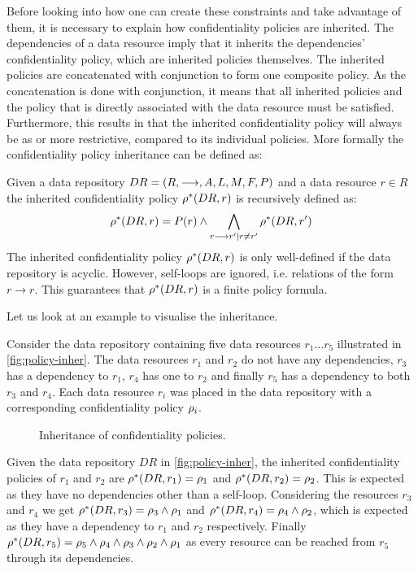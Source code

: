 Before looking into how one can create these constraints and take advantage of them, it is necessary to explain how confidentiality policies are inherited. The dependencies of a data resource imply that it inherits the dependencies' confidentiality policy, which are inherited policies themselves. The inherited policies are concatenated with conjunction to form one composite policy. As the concatenation is done with conjunction, it means that all inherited policies and the policy that is directly associated with the data resource must be satisfied. Furthermore, this results in that the inherited confidentiality policy will always be as or more restrictive, compared to its individual policies. More formally the confidentiality policy inheritance can be defined as:
\begin{definition}\label{def:cpi}
Given a data repository $DR= \left( R, \longrightarrow, A, L, M, F, P \right)$ and a data resource $r \in R$ the inherited confidentiality policy $\rho^{\ast}(DR, r)$ is recursively defined as:
\begin{equation*}
    \rho^{\ast}(DR, r) = P(r) \land \bigwedge\limits_{r \longrightarrow r' \mid r \neq r'} \rho^{\ast}(DR, r')
\end{equation*}
The inherited confidentiality policy $\rho^{\ast}(DR, r)$ is only well-defined if the data repository is acyclic. However, self-loops are ignored, i.e. relations of the form $r \longrightarrow r$. This guarantees that $\rho^{\ast}(DR, r)$ is a finite policy formula.
\end{definition}

Let us look at an example to visualise the inheritance.
\begin{example}
Consider the data repository containing five data resources $r_1\ldots r_5$ illustrated in \autoref{fig:policy-inher}. The data resources $r_1$ and $r_2$ do not have any dependencies, $r_3$ has a dependency to $r_1$, $r_4$ has one to $r_2$ and finally $r_5$ has a dependency to both $r_3$ and $r_4$. Each data resource $r_i$ was placed in the data repository with a corresponding confidentiality policy $\rho_i$.
\begin{figure}[!ht]
    \begin{center}
        
        \caption{Inheritance of confidentiality policies.}
        \label{fig:policy-inher}
    \end{center}
\end{figure}
Given the data repository $DR$ in \autoref{fig:policy-inher}, the inherited confidentiality policies of $r_1$ and $r_2$ are $\rho^{\ast}(DR, r_1) = \rho_1$ and $\rho^{\ast}(DR, r_2) = \rho_2$. This is expected as they have no dependencies other than a self-loop. Considering the resources $r_3$ and $r_4$ we get $\rho^{\ast}(DR, r_3) = \rho_3 \land \rho_1$ and $\rho^{\ast}(DR, r_4) = \rho_4 \land \rho_2$, which is expected as they have a dependency to $r_1$ and $r_2$ respectively. Finally $\rho^{\ast}(DR, r_5) = \rho_5 \land \rho_4 \land \rho_3 \land \rho_2 \land \rho_1$ as every resource can be reached from $r_5$ through its dependencies.
\end{example}

